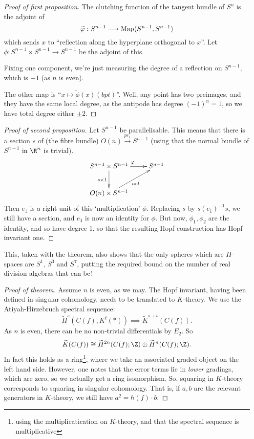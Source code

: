 \documentclass[11pt]{article}
\begin{document}
\begin{MarkusHopfInvOne}
\begin{proof}[Proof of first proposition]
The clutching function of the tangent bundle of $S^n$ is the adjoint of
\[\widetilde{\varphi}:S^{n-1}\longrightarrow\operatorname{Map}(S^{n-1},S^{n-1})\]
which sends $x$ to ``reflection along the hyperplane orthogonal to $x$''. Let $\phi:S^{n-1}\times S^{n-1}\to S^{n-1}$ be the adjoint of this.

Fixing one component, we're just measuring the degree of a reflection on $S^{n-1}$, which is $-1$ (as $n$ is even).

The other map is ``$x\mapsto \widetilde\phi(x)(bpt)$''. Well, any point has two preimages, and they have the same local degree, as the antipode has degree $(-1)^n=1$, so we have total degree either $\pm2$.
\end{proof}
\begin{proof}[Proof of second proposition]
Let $S^{n-1}$ be parallelisable. This means that there is a section $s$ of (the fibre bundle) $O(n)\overset{pr_1}{\to}S^{n-1}$ (using that the normal bundle of $S^{n-1}$ in $\R^n$ is trivial).
\[\xymatrix{S^{n-1}\times S^{n-1}\ar[r]^\phi\ar[d]_{s\times 1}&S^{n-1}\\
O(n)\times S^{n-1}\ar[ur]_{act}&
}\]
Then $e_1$ is a right unit of this `multiplication' $\phi$. Replacing $s$ by $s(e_1)^{-1}s$, we still have a section, and $e_1$ is now an identity for $\phi$. But now, $\phi_1,\phi_2$ are the identity, and so have degree 1, so that the resulting Hopf construction has Hopf invariant one.
\end{proof}
\noindent This, taken with the theorem, also shows that the only spheres which are $H$-spaces are $S^1$, $S^3$ and $S^7$, putting the required bound on the number of real division algebras that can be!
\begin{proof}[Proof of theorem]
Assume $n$ is even, as we may.
The Hopf invariant, having been defined in singular cohomology, needs to be translated to $K$-theory. We use the Atiyah-Hirzebruch spectral sequence:
\[\widetilde H^s(C(f),K^t(\ast))\implies \widetilde K^{s+t}(C(f)).\]
As $n$ is even, there can be no non-trivial differentials by $E_2$. So 
\[\widetilde K(C(f))\cong\widetilde H^{2n}(C(f);\Z)\oplus \widetilde H^n(C(f);\Z).\]
In fact this holds as a ring\footnote{using the multiplicatication on $K$-theory, and that the spectral sequence is multiplicative}, where we take an associated graded object on the left hand side. However, one notes that the error terms lie in \emph{lower} gradings, which are zero, so we actually get a ring isomorphism. So, squaring in $K$-theory corresponds to squaring in singular cohomology. That is, if $a,b$ are the relevant generators  in $K$-theory, we still have $a^2=h(f)\cdot b$.


\end{proof}
\end{MarkusHopfInvOne}
\end{document}
